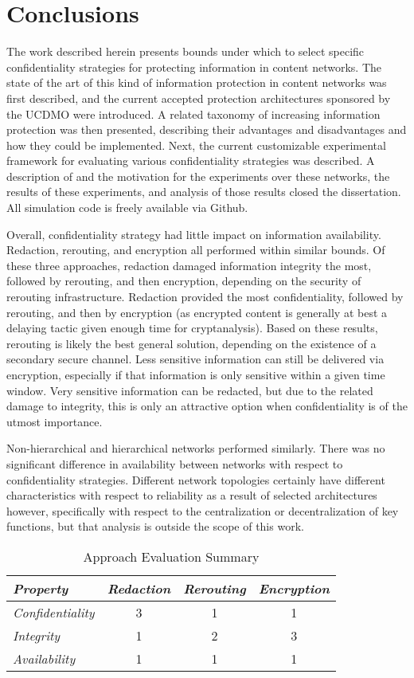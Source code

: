 \section{Conclusions}
The work described herein presents bounds under which to select specific confidentiality strategies for protecting information in content networks.  The state of the art of this kind of information protection in content networks was first described, and the current accepted protection architectures sponsored by the UCDMO were introduced.  A related taxonomy of increasing information protection was then presented, describing their advantages and disadvantages and how they could be implemented.  Next, the current customizable experimental framework for evaluating various confidentiality strategies was described.  A description of and the motivation for the experiments over these networks, the results of these experiments, and analysis of those results closed the dissertation.  All simulation code is freely available via Github.

Overall, confidentiality strategy had little impact on information availability.  Redaction, rerouting, and encryption all performed within similar bounds.  Of these three approaches, redaction damaged information integrity the most, followed by rerouting, and then encryption, depending on the security of rerouting infrastructure.  Redaction provided the most confidentiality, followed by rerouting, and then by encryption (as encrypted content is generally at best a delaying tactic given enough time for cryptanalysis).  Based on these results, rerouting is likely the best general solution, depending on the existence of a secondary secure channel.  Less sensitive information can still be delivered via encryption, especially if that information is only sensitive within a given time window.  Very sensitive information can be redacted, but due to the related damage to integrity, this is only an attractive option when confidentiality is of the utmost importance.
	
Non-hierarchical and hierarchical networks performed similarly.  There was no significant difference in availability between networks with respect to confidentiality strategies.  Different network topologies certainly have different characteristics with respect to reliability as a result of selected architectures however, specifically with respect to the centralization or decentralization of key functions, but that analysis is outside the scope of this work.
	
\begin{table*}[tp] %
\centering %
\begin{tabular}{lccc}
\toprule %
{\it Property}			& {\it Redaction}	& {\it Rerouting} 	& {\it Encryption} 	\\\toprule
{\it Confidentiality} 	& 3				  	& 1					& 1				 	\\\midrule
{\it Integrity}			& 1					& 2					& 3 					\\\midrule
{\it Availability}		& 1					& 1					& 1					\\\bottomrule
\end{tabular}
\caption{Approach Evaluation Summary}
\label{table:model:evaluation}
\end{table*}

